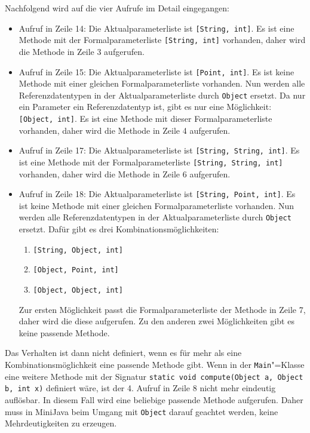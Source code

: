 

Nachfolgend wird auf die vier Aufrufe im Detail eingegangen:
\begin{itemize}
    \item Aufruf in Zeile 14: Die Aktualparameterliste ist \lstinline{[String, int]}. Es ist eine Methode mit der Formalparameterliste \lstinline{[String, int]} vorhanden, daher wird die Methode in Zeile 3 aufgerufen.
    \item Aufruf in Zeile 15: Die Aktualparameterliste ist \lstinline{[Point, int]}. Es ist keine Methode mit einer gleichen Formalparameterliste vorhanden. Nun werden alle Referenzdatentypen in der Aktualparameterliste durch \lstinline{Object} ersetzt. Da nur ein Parameter ein Referenzdatentyp ist, gibt es nur eine Möglichkeit: \lstinline{[Object, int]}. Es ist eine Methode mit dieser Formalparameterliste vorhanden, daher wird die Methode in Zeile 4 aufgerufen.
    \item Aufruf in Zeile 17: Die Aktualparameterliste ist \lstinline{[String, String, int]}. Es ist eine Methode mit der Formalparameterliste \lstinline{[String, String, int]} vorhanden, daher wird die Methode in Zeile 6 aufgerufen.
    \item Aufruf in Zeile 18: Die Aktualparameterliste ist \lstinline{[String, Point, int]}. Es ist keine Methode mit einer gleichen Formalparameterliste vorhanden. Nun werden alle Referenzdatentypen in der Aktualparameterliste durch \lstinline{Object} ersetzt. Dafür gibt es drei Kombinationsmöglichkeiten:
    \begin{enumerate}
        \item \lstinline{[String, Object, int]}
        \item \lstinline{[Object, Point, int]}
        \item \lstinline{[Object, Object, int]}
    \end{enumerate}
    Zur ersten Möglichkeit passt die Formalparameterliste der Methode in Zeile 7, daher wird die diese aufgerufen. Zu den anderen zwei Möglichkeiten gibt es keine passende Methode.
\end{itemize}

Das Verhalten ist dann nicht definiert, wenn es für mehr als eine Kombinationsmöglichkeit eine passende Methode gibt. Wenn in der \lstinline{Main}"=Klasse eine weitere Methode mit der Signatur \lstinline{static void compute(Object a, Object b, int x)} definiert wäre, ist der 4. Aufruf in Zeile 8 nicht mehr eindeutig auflösbar. In diesem Fall wird eine beliebige passende Methode aufgerufen. Daher muss in MiniJava beim Umgang mit \lstinline{Object} darauf geachtet werden, keine Mehrdeutigkeiten zu erzeugen.

